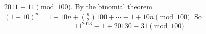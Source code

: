 $2011\equiv11\pmod{100}$. By the binomial theorem $(1+10)^n=1+10n+\binom n2100+\cdots\equiv1+10n\pmod{100}$. So
\[11^{2013}\equiv1+20130\equiv\boxed{31}\pmod{100}.\]
